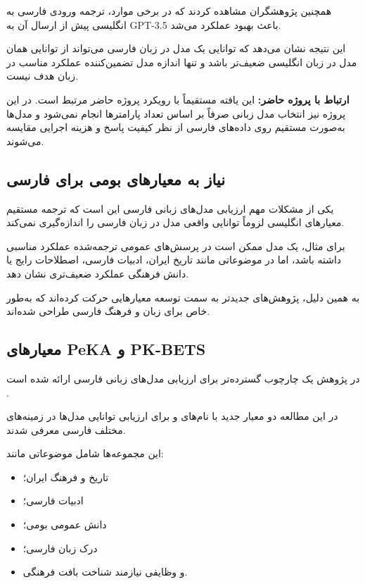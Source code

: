همچنین پژوهشگران مشاهده کردند که در برخی موارد، ترجمه ورودی
فارسی به انگلیسی پیش از ارسال آن به GPT-3.5 باعث بهبود عملکرد
می‌شد.

این نتیجه نشان می‌دهد که توانایی یک مدل در زبان فارسی می‌تواند
از توانایی همان مدل در زبان انگلیسی ضعیف‌تر باشد و تنها اندازه
مدل تضمین‌کننده عملکرد مناسب در زبان هدف نیست.

\textbf{ارتباط با پروژه حاضر:}
این یافته مستقیماً با رویکرد پروژه حاضر مرتبط است.
در این پروژه نیز انتخاب مدل زبانی صرفاً بر اساس تعداد
پارامترها انجام نمی‌شود و مدل‌ها به‌صورت مستقیم روی داده‌های
فارسی از نظر کیفیت پاسخ و هزینه اجرایی مقایسه می‌شوند.


\subsection{نیاز به معیارهای بومی برای فارسی}

یکی از مشکلات مهم ارزیابی مدل‌های زبانی فارسی این است که
ترجمه مستقیم معیارهای انگلیسی لزوماً توانایی واقعی مدل در
زبان فارسی را اندازه‌گیری نمی‌کند.

برای مثال، یک مدل ممکن است در پرسش‌های عمومی ترجمه‌شده عملکرد
مناسبی داشته باشد، اما در موضوعاتی مانند تاریخ ایران،
ادبیات فارسی، اصطلاحات رایج یا دانش فرهنگی عملکرد ضعیف‌تری
نشان دهد.

به همین دلیل، پژوهش‌های جدیدتر به سمت توسعه معیارهایی حرکت
کرده‌اند که به‌طور خاص برای زبان و فرهنگ فارسی طراحی شده‌اند.


\subsection{معیارهای PeKA و PK-BETS}

در پژوهش
یک چارچوب گسترده‌تر برای ارزیابی مدل‌های زبانی فارسی ارائه
شده است
\cite{hosseinbeigi2025persianllm}.

در این مطالعه دو معیار جدید با نام‌های
و
برای ارزیابی توانایی مدل‌ها در زمینه‌های مختلف فارسی معرفی
شدند.

این مجموعه‌ها شامل موضوعاتی مانند:

\begin{itemize}

    \item تاریخ و فرهنگ ایران؛

    \item ادبیات فارسی؛

    \item دانش عمومی بومی؛

    \item درک زبان فارسی؛

    \item و وظایفی نیازمند شناخت بافت فرهنگی.

\end{itemize}

